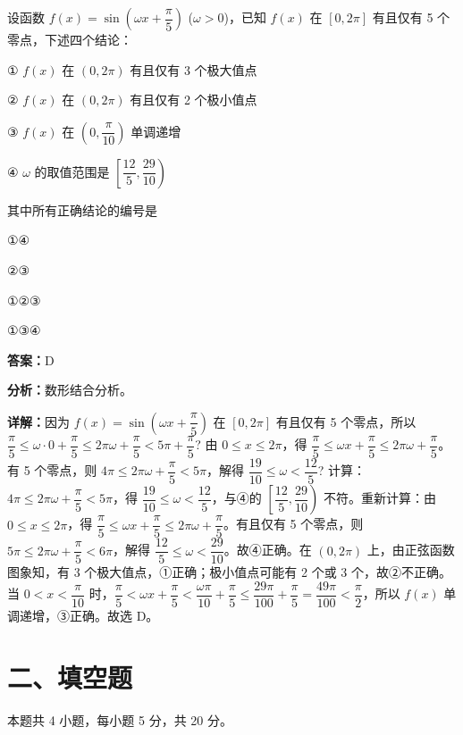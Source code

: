 \begin{question}[points=5]
设函数 $f(x) = \sin\left(\omega x + \dfrac{\pi}{5}\right)$ ($\omega > 0$)，已知 $f(x)$ 在 $[0,2\pi]$ 有且仅有 5 个零点，下述四个结论：

① $f(x)$ 在 $(0,2\pi)$ 有且仅有 3 个极大值点

② $f(x)$ 在 $(0,2\pi)$ 有且仅有 2 个极小值点

③ $f(x)$ 在 $\left(0,\dfrac{\pi}{10}\right)$ 单调递增

④ $\omega$ 的取值范围是 $\left[\dfrac{12}{5},\dfrac{29}{10}\right)$

其中所有正确结论的编号是
\begin{choices}
  \item ①④
  \item ②③
  \item ①②③
  \item ①③④
\end{choices}
\begin{solution}
\textbf{答案：}D

\textbf{分析：}数形结合分析。

\textbf{详解：}因为 $f(x) = \sin\left(\omega x + \dfrac{\pi}{5}\right)$ 在 $[0,2\pi]$ 有且仅有 5 个零点，所以 $\dfrac{\pi}{5} \le \omega \cdot 0 + \dfrac{\pi}{5} \le 2\pi\omega + \dfrac{\pi}{5} < 5\pi + \dfrac{\pi}{5}$? 由 $0\le x\le 2\pi$，得 $\dfrac{\pi}{5} \le \omega x + \dfrac{\pi}{5} \le 2\pi\omega + \dfrac{\pi}{5}$。有 5 个零点，则 $4\pi \le 2\pi\omega + \dfrac{\pi}{5} < 5\pi$，解得 $\dfrac{19}{10} \le \omega < \dfrac{12}{5}$? 计算：$4\pi \le 2\pi\omega + \dfrac{\pi}{5} < 5\pi$，得 $\dfrac{19}{10} \le \omega < \dfrac{12}{5}$，与④的 $\left[\dfrac{12}{5},\dfrac{29}{10}\right)$ 不符。重新计算：由 $0\le x\le 2\pi$，得 $\dfrac{\pi}{5} \le \omega x + \dfrac{\pi}{5} \le 2\pi\omega + \dfrac{\pi}{5}$。有且仅有 5 个零点，则 $5\pi \le 2\pi\omega + \dfrac{\pi}{5} < 6\pi$，解得 $\dfrac{12}{5} \le \omega < \dfrac{29}{10}$。故④正确。在 $(0,2\pi)$ 上，由正弦函数图象知，有 3 个极大值点，①正确；极小值点可能有 2 个或 3 个，故②不正确。当 $0<x<\dfrac{\pi}{10}$ 时，$\dfrac{\pi}{5} < \omega x + \dfrac{\pi}{5} < \dfrac{\omega\pi}{10} + \dfrac{\pi}{5} \le \dfrac{29\pi}{100} + \dfrac{\pi}{5} = \dfrac{49\pi}{100} < \dfrac{\pi}{2}$，所以 $f(x)$ 单调递增，③正确。故选 D。
\end{solution}
\end{question}

\section*{二、填空题}
本题共 4 小题，每小题 5 分，共 20 分。

